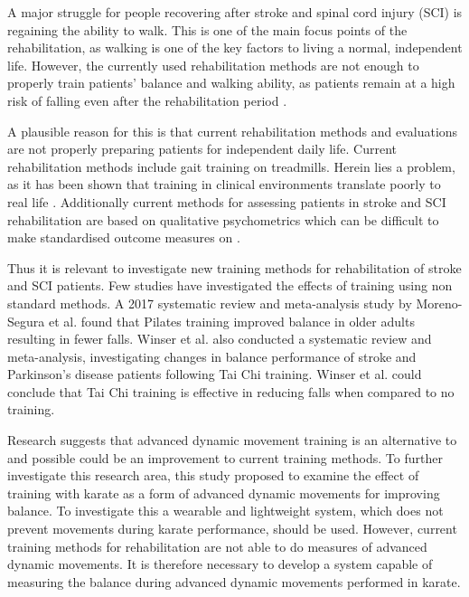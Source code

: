 
A major struggle for people recovering after stroke and spinal cord injury (SCI) is regaining the ability to walk. This is one of the main focus points of the rehabilitation, as walking is one of the key factors to living a normal, independent life. However, the currently used rehabilitation methods are not enough to properly train patients' balance and walking ability, as patients remain at a high risk of falling even after the rehabilitation period \cite{Blennerhassett2012, Hanger2014, Wannapakhe2015, Wong2016, Bhalla2016}.

A plausible reason for this is that current rehabilitation methods and evaluations are not properly preparing patients for independent daily life. Current rehabilitation methods include gait training on treadmills. Herein lies a problem, as it has been shown that training in clinical environments translate poorly to real life \cite{Basteris2014}. Additionally current methods for assessing patients in stroke and SCI rehabilitation are based on qualitative psychometrics which can be difficult to make standardised outcome measures on \cite{Wang2010, ANPT_SCI2018, ANPT_Stroke2018, Sullivan2013}. %

Thus it is relevant to investigate new training methods for rehabilitation of stroke and SCI patients. Few studies have investigated the effects of training using non standard methods. A 2017 systematic review and meta-analysis study by Moreno-Segura et al. \cite{Moreno2017} found that Pilates training improved balance in older adults resulting in fewer falls.%
Winser et al. \cite{Winser2018} also conducted a systematic review and meta-analysis, investigating changes in balance performance of stroke and Parkinson's disease patients following Tai Chi training. Winser et al. could conclude that Tai Chi training is effective in reducing falls when compared to no training.  

Research suggests that advanced dynamic movement training is an alternative to and possible could be an improvement to current training methods. 
To further investigate this research area, this study proposed to examine the effect of training with karate as a form of advanced dynamic movements for improving balance. 
To investigate this a wearable and lightweight system, which does not prevent movements during karate performance, should be used. However, current training methods for rehabilitation are not able to do measures of advanced dynamic movements. It is therefore necessary to develop a system capable of measuring the balance during advanced dynamic movements performed in karate. 

